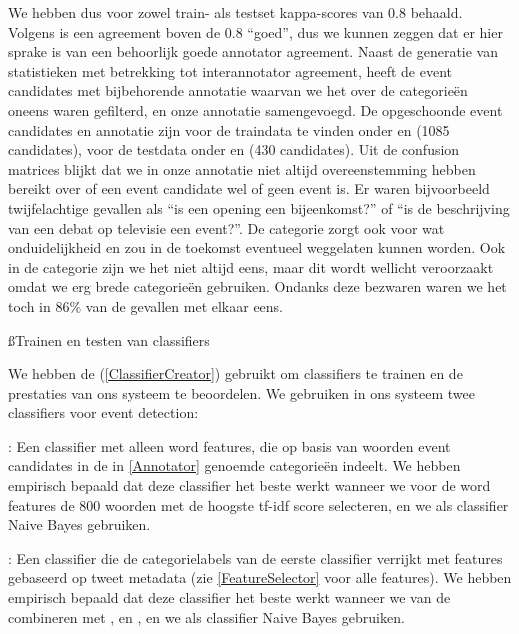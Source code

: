 {{We hebben dus voor zowel train- als testset kappa-scores van 0.8 behaald. Volgens \citeauthor{manning2008introduction} is 
een agreement boven de 0.8 ``goed'', dus we kunnen zeggen dat er hier sprake is van een behoorlijk goede annotator agreement.
\vl
Naast de generatie van statistieken met betrekking tot interannotator agreement, heeft  de event candidates
met bijbehorende annotatie waarvan we het over de categorie\"en oneens waren gefilterd, en onze 
annotatie samengevoegd. De opgeschoonde event candidates en annotatie zijn voor de traindata te vinden onder 
 en  (1085 candidates), voor de testdata onder 
 en  (430 candidates).
\vl
Uit de confusion matrices blijkt dat we in onze annotatie niet altijd overeenstemming hebben bereikt over of een event candidate
wel of geen event is. Er waren bijvoorbeeld twijfelachtige gevallen als 
``is een opening een bijeenkomst?'' of ``is de beschrijving van een debat op televisie een event?''. De categorie 
zorgt ook voor wat onduidelijkheid en zou in de toekomst eventueel weggelaten kunnen worden. Ook in de categorie 
zijn we het niet altijd eens, maar dit wordt wellicht veroorzaakt omdat we erg brede categorie\"en gebruiken. Ondanks deze bezwaren
waren we het toch in 86\% van de gevallen met elkaar eens.

\ss{Trainen en testen van classifiers}\label{traintest}

We hebben de  (\ref{ClassifierCreator}) gebruikt om classifiers te trainen en de prestaties van ons systeem te
beoordelen. We gebruiken in ons systeem twee classifiers voor event detection:
\begin{bullets}
\item {}: Een classifier met alleen word features, die op basis van woorden event candidates in de in \ref{Annotator} genoemde 
categorie\"en indeelt. We hebben empirisch bepaald dat deze classifier het beste werkt wanneer we voor de word features de
800 woorden met de hoogste tf-idf score selecteren, en we als classifier Naive Bayes gebruiken.
\item {}: Een classifier die de categorielabels van de eerste classifier verrijkt met features gebaseerd op tweet metadata (zie \ref{FeatureSelector}
voor alle features). We hebben empirisch bepaald dat deze classifier het beste werkt wanneer we  van de 
combineren met ,  en , en we als classifier Naive Bayes gebruiken.
\end{bullets}

}}
